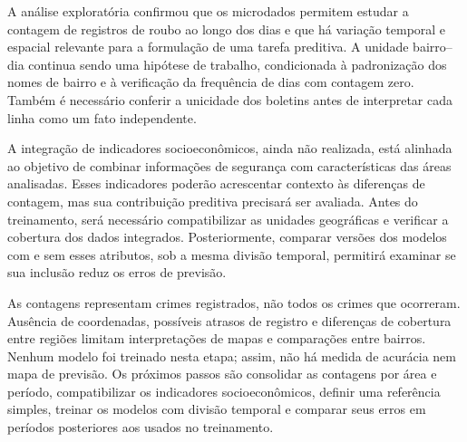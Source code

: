 \documentclass[12pt]{article}
\begin{document}
A análise exploratória confirmou que os microdados permitem estudar a contagem de registros de roubo ao longo dos dias e que há variação temporal e espacial relevante para a formulação de uma tarefa preditiva. A unidade bairro--dia continua sendo uma hipótese de trabalho, condicionada à padronização dos nomes de bairro e à verificação da frequência de dias com contagem zero. Também é necessário conferir a unicidade dos boletins antes de interpretar cada linha como um fato independente.

A integração de indicadores socioeconômicos, ainda não realizada, está alinhada ao objetivo de combinar informações de segurança com características das áreas analisadas. Esses indicadores poderão acrescentar contexto às diferenças de contagem, mas sua contribuição preditiva precisará ser avaliada. Antes do treinamento, será necessário compatibilizar as unidades geográficas e verificar a cobertura dos dados integrados. Posteriormente, comparar versões dos modelos com e sem esses atributos, sob a mesma divisão temporal, permitirá examinar se sua inclusão reduz os erros de previsão.

As contagens representam crimes registrados, não todos os crimes que ocorreram. Ausência de coordenadas, possíveis atrasos de registro e diferenças de cobertura entre regiões limitam interpretações de mapas e comparações entre bairros. Nenhum modelo foi treinado nesta etapa; assim, não há medida de acurácia nem mapa de previsão. Os próximos passos são consolidar as contagens por área e período, compatibilizar os indicadores socioeconômicos, definir uma referência simples, treinar os modelos com divisão temporal e comparar seus erros em períodos posteriores aos usados no treinamento.
\end{document}
